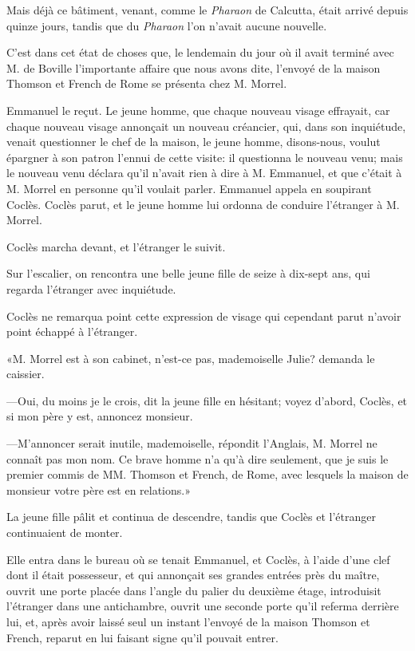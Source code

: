 Mais déjà ce bâtiment, venant, comme le \textit{Pharaon} de Calcutta, était arrivé depuis quinze jours, tandis que du \textit{Pharaon} l'on n'avait aucune nouvelle.

C'est dans cet état de choses que, le lendemain du jour où il avait terminé avec M. de Boville l'importante affaire que nous avons dite, l'envoyé de la maison Thomson et French de Rome se présenta chez M. Morrel.

Emmanuel le reçut. Le jeune homme, que chaque nouveau visage effrayait, car chaque nouveau visage annonçait un nouveau créancier, qui, dans son inquiétude, venait questionner le chef de la maison, le jeune homme, disons-nous, voulut épargner à son patron l'ennui de cette visite: il questionna le nouveau venu; mais le nouveau venu déclara qu'il n'avait rien à dire à M. Emmanuel, et que c'était à M. Morrel en personne qu'il voulait parler. Emmanuel appela en soupirant Coclès. Coclès parut, et le jeune homme lui ordonna de conduire l'étranger à M. Morrel.

Coclès marcha devant, et l'étranger le suivit.

Sur l'escalier, on rencontra une belle jeune fille de seize à dix-sept ans, qui regarda l'étranger avec inquiétude.

Coclès ne remarqua point cette expression de visage qui cependant parut n'avoir point échappé à l'étranger.

«M. Morrel est à son cabinet, n'est-ce pas, mademoiselle Julie? demanda le caissier.

—Oui, du moins je le crois, dit la jeune fille en hésitant; voyez d'abord, Coclès, et si mon père y est, annoncez monsieur.

—M'annoncer serait inutile, mademoiselle, répondit l'Anglais, M. Morrel ne connaît pas mon nom. Ce brave homme n'a qu'à dire seulement, que je suis le premier commis de MM. Thomson et French, de Rome, avec lesquels la maison de monsieur votre père est en relations.»

La jeune fille pâlit et continua de descendre, tandis que Coclès et l'étranger continuaient de monter.

Elle entra dans le bureau où se tenait Emmanuel, et Coclès, à l'aide d'une clef dont il était possesseur, et qui annonçait ses grandes entrées près du maître, ouvrit une porte placée dans l'angle du palier du deuxième étage, introduisit l'étranger dans une antichambre, ouvrit une seconde porte qu'il referma derrière lui, et, après avoir laissé seul un instant l'envoyé de la maison Thomson et French, reparut en lui faisant signe qu'il pouvait entrer.

